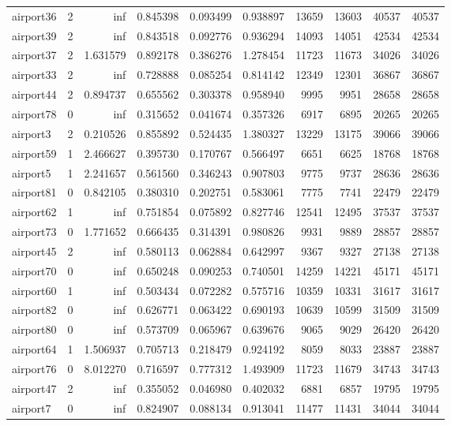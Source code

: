 \begin{longtable}{|l|r|r|r|r|r|r|r|r|r|}
airport36 & 2 & inf & 0.845398 & 0.093499 & 0.938897 & 13659 & 13603 & 40537 & 40537 \\
airport39 & 2 & inf & 0.843518 & 0.092776 & 0.936294 & 14093 & 14051 & 42534 & 42534 \\
airport37 & 2 & 1.631579 & 0.892178 & 0.386276 & 1.278454 & 11723 & 11673 & 34026 & 34026 \\
airport33 & 2 & inf & 0.728888 & 0.085254 & 0.814142 & 12349 & 12301 & 36867 & 36867 \\
airport44 & 2 & 0.894737 & 0.655562 & 0.303378 & 0.958940 & 9995 & 9951 & 28658 & 28658 \\
airport78 & 0 & inf & 0.315652 & 0.041674 & 0.357326 & 6917 & 6895 & 20265 & 20265 \\
airport3 & 2 & 0.210526 & 0.855892 & 0.524435 & 1.380327 & 13229 & 13175 & 39066 & 39066 \\
airport59 & 1 & 2.466627 & 0.395730 & 0.170767 & 0.566497 & 6651 & 6625 & 18768 & 18768 \\
airport5 & 1 & 2.241657 & 0.561560 & 0.346243 & 0.907803 & 9775 & 9737 & 28636 & 28636 \\
airport81 & 0 & 0.842105 & 0.380310 & 0.202751 & 0.583061 & 7775 & 7741 & 22479 & 22479 \\
airport62 & 1 & inf & 0.751854 & 0.075892 & 0.827746 & 12541 & 12495 & 37537 & 37537 \\
airport73 & 0 & 1.771652 & 0.666435 & 0.314391 & 0.980826 & 9931 & 9889 & 28857 & 28857 \\
airport45 & 2 & inf & 0.580113 & 0.062884 & 0.642997 & 9367 & 9327 & 27138 & 27138 \\
airport70 & 0 & inf & 0.650248 & 0.090253 & 0.740501 & 14259 & 14221 & 45171 & 45171 \\
airport60 & 1 & inf & 0.503434 & 0.072282 & 0.575716 & 10359 & 10331 & 31617 & 31617 \\
airport82 & 0 & inf & 0.626771 & 0.063422 & 0.690193 & 10639 & 10599 & 31509 & 31509 \\
airport80 & 0 & inf & 0.573709 & 0.065967 & 0.639676 & 9065 & 9029 & 26420 & 26420 \\
airport64 & 1 & 1.506937 & 0.705713 & 0.218479 & 0.924192 & 8059 & 8033 & 23887 & 23887 \\
airport76 & 0 & 8.012270 & 0.716597 & 0.777312 & 1.493909 & 11723 & 11679 & 34743 & 34743 \\
airport47 & 2 & inf & 0.355052 & 0.046980 & 0.402032 & 6881 & 6857 & 19795 & 19795 \\
airport7 & 0 & inf & 0.824907 & 0.088134 & 0.913041 & 11477 & 11431 & 34044 & 34044 \\

\end{longtable}
